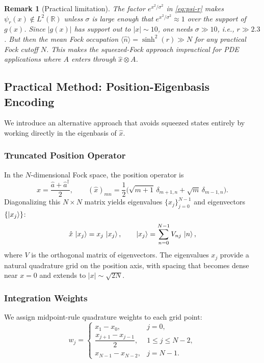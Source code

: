 \documentclass[11pt]{article}
\newtheorem{remark}{Remark}
\begin{document}
\begin{remark}[Practical limitation]
The factor $e^{x^2/\sigma^2}$ in \cref{eq:psi-r} makes
$\psi_r(x) \notin L^2(\mathbb{R})$ unless $\sigma$ is large enough that
$e^{x^2/\sigma^2} \approx 1$ over the support of $g(x)$.
Since $|g(x)|$ has support out to $|x| \sim 10$, one needs
$\sigma \gg 10$, i.e., $r \gg 2.3$.  But then the mean Fock occupation
$\langle \hat{n} \rangle = \sinh^2(r) \gg N$ for any practical Fock
cutoff $N$.  This makes the squeezed-Fock approach impractical for
PDE applications where $A$ enters through $\hat{x} \otimes A$.
\end{remark}

\subsection{Practical Method: Position-Eigenbasis Encoding}

We introduce an alternative approach that avoids squeezed states entirely
by working directly in the eigenbasis of $\hat{x}$.

\subsubsection{Truncated Position Operator}

In the $N$-dimensional Fock space, the position operator is
\begin{equation}\label{eq:x-fock}
  \hat{x} = \frac{\hat{a} + \hat{a}^\dagger}{2},
  \qquad (\hat{x})_{mn} = \frac{1}{2}\bigl(\sqrt{m+1}\,\delta_{m+1,n}
  + \sqrt{m}\,\delta_{m-1,n}\bigr).
\end{equation}
Diagonalizing this $N \times N$ matrix yields eigenvalues $\{x_j\}_{j=0}^{N-1}$
and eigenvectors $\{\ket{x_j}\}$:
\begin{equation}
  \hat{x}\,\ket{x_j} = x_j\,\ket{x_j}, \qquad
  \ket{x_j} = \sum_{n=0}^{N-1} V_{nj}\,\ket{n},
\end{equation}
where $V$ is the orthogonal matrix of eigenvectors.
The eigenvalues $x_j$ provide a natural quadrature grid on the
position axis, with spacing that becomes dense near $x=0$ and extends
to $|x| \sim \sqrt{2N}$.

\subsubsection{Integration Weights}

We assign midpoint-rule quadrature weights to each grid point:
\begin{equation}\label{eq:weights}
  w_j = \begin{cases}
    x_1 - x_0, & j=0, \\[4pt]
    \dfrac{x_{j+1}-x_{j-1}}{2}, & 1 \leq j \leq N-2, \\[4pt]
    x_{N-1} - x_{N-2}, & j = N-1.
  \end{cases}
\end{equation}
\end{document}
